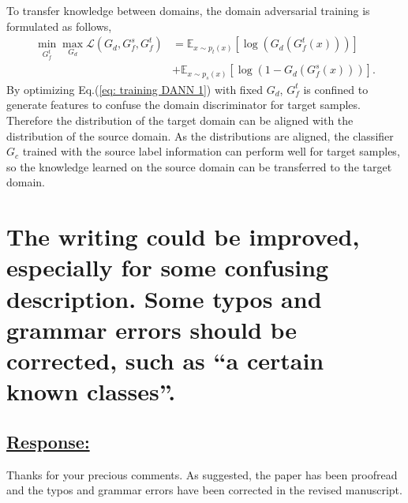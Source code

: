 To transfer knowledge between domains, the domain adversarial training is formulated as follows,
\begin{equation}
    \label{eq: training DANN 1}
    \begin{split}
        \min_{G_f^t} \max_{G_d} \mathscr{L}(G_d,G^{s}_{f},G_f^t) &=\mathbb{E}_{x\sim p_t(x)} \left[ \log \left(G_d\left(G_f^t\left(x\right)\right)\right) \right]\\
        &+\mathbb{E}_{x\sim p_s(x)}\left[ \log \left(1-G_d\left(G_f^s\left(x\right)\right)\right) \right].
    \end{split}
\end{equation}
By optimizing Eq.(\ref{eq: training DANN 1}) with fixed $G_d$, $G_f^t$ is confined to generate features to confuse the domain discriminator for target samples.
Therefore the distribution of the target domain can be aligned with the distribution of the source domain.
As the distributions are aligned, the classifier $G_c$ trained with the source label information can perform well for target samples, so the knowledge learned on the source domain can be transferred to the target domain.


\section{The writing could be improved, especially for some confusing description.
Some typos and grammar errors should be corrected, such as ``a certain known classes''.}

\subsection*{\underline{\textbf{Response:}}}

Thanks for your precious comments.
As suggested, the paper has been proofread and the typos and grammar errors have been corrected in the revised manuscript.
